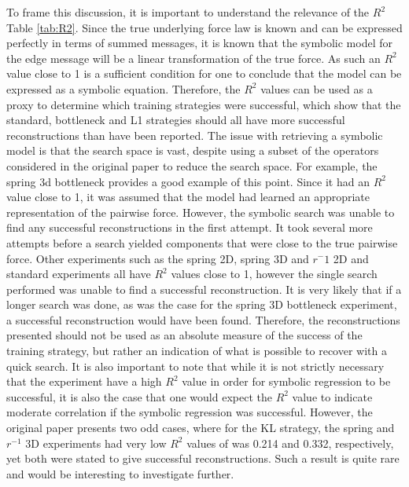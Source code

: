 \documentclass[11pt]{article}
\begin{document}
To frame this discussion, it is important to understand the relevance of the $R^2$ Table \ref{tab:R2}. Since the true underlying force law is known and can be expressed perfectly in terms of summed messages, it is known that the symbolic model for the edge message will be a linear transformation of the true force. As such an $R^2$ value close to 1 is a sufficient condition for one to conclude that the model can be expressed as a symbolic equation. Therefore, the $R^2$ values can be used as a proxy to determine which training strategies were successful, which show that the standard, bottleneck and L1 strategies should all have more successful reconstructions than have been reported. The issue with retrieving a symbolic model is that the search space is vast, despite using a subset of the operators considered in the original paper to reduce the search space. For example, the spring 3d bottleneck provides a good example of this point. Since it had an $R^2$ value close to 1, it was assumed that the model had learned an appropriate representation of the pairwise force. However, the symbolic search was unable to find any successful reconstructions in the first attempt. It took several more attempts before a search yielded components that were close to the true pairwise force. Other experiments such as the spring 2D, spring 3D and $r^-1$ 2D and standard experiments all have $R^2$ values close to 1, however the single search performed was unable to find a successful reconstruction. It is very likely that if a longer search was done, as was the case for the spring 3D bottleneck experiment, a successful reconstruction would have been found. Therefore, the reconstructions presented should not be used as an absolute measure of the success of the training strategy, but rather an indication of what is possible to recover with a quick search. It is also important to note that while it is not strictly necessary that the experiment have a high $R^2$ value in order for symbolic regression to be successful, it is also the case that one would expect the $R^2$ value to indicate moderate correlation if the symbolic regression was successful. However, the original paper presents two odd cases, where for the KL strategy, the spring and $r^{-1}$ 3D experiments had very low $R^2$ values of was 0.214 and 0.332, respectively, yet both were stated to give successful reconstructions. Such a result is quite rare and would be interesting to investigate further.
\end{document}
